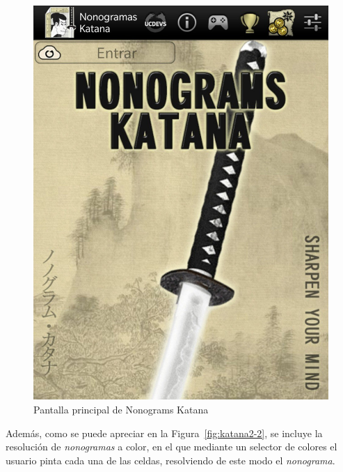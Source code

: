 \begin{figure}[H]
   \centering
   \includegraphics[scale=.15]{images/nonokatana1.jpg}
   \caption{Pantalla principal de Nonograms Katana}
   \label{fig:katana1}
 \end{figure}

 Además, como se puede apreciar en la Figura~\ref{fig:katana2-2}, se incluye la resolución de \textit{nonogramas} a color, en el que mediante un selector
 de colores el usuario pinta cada una de las celdas, resolviendo de este modo el \textit{nonograma}.

